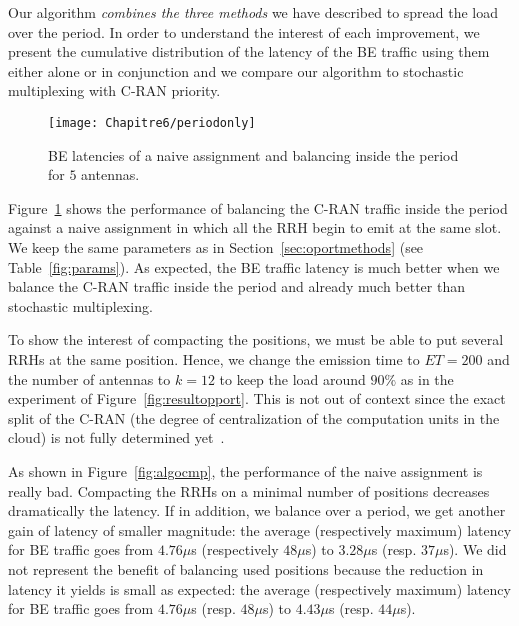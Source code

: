   Our algorithm \emph{combines the three methods} we have described to spread the load over the period.
  In order to understand the interest of each improvement, we present the cumulative distribution of the latency of the BE traffic using them either alone or in conjunction and we compare our algorithm to stochastic multiplexing with C-RAN priority.
   
\begin{figure}[h!]
\begin{center}   

      \texttt{[image: Chapitre6/periodonly]}
     \caption{BE latencies of a naive assignment and balancing inside the period for $5$ antennas.}  
     \label{fig:periodonly}
  \end{center}
  \end{figure}
    
Figure~\ref{fig:periodonly} shows the performance of balancing the C-RAN traffic inside the period against a naive assignment in which all the RRH begin to emit at the same slot. We keep the same parameters as in Section~\ref{sec:oportmethods} (see Table~\ref{fig:params}). As expected, the BE traffic latency is much better when we balance the C-RAN traffic inside the period and already much better than stochastic multiplexing.

To show the interest of compacting the positions, we must be able to put several RRHs at the same position.
Hence, we change the emission time to $ET = 200$ and the number of antennas to $k = 12$ to keep the load around $90\%$ as in the experiment of Figure~\ref{fig:resultopport}. This is not out of context since the exact split of the C-RAN (the degree of centralization of the computation units in the cloud) is not fully determined yet~\cite{mobile2011c}. 



As shown in Figure~\ref{fig:algocmp}, the performance of the naive assignment is really bad. Compacting the RRHs on a minimal number of positions decreases dramatically the latency. If in addition, we balance over a period, we get another gain of latency of smaller magnitude: the average (respectively maximum) latency for BE traffic goes from $4.76 \mu$s (respectively $48 \mu$s) to $3.28 \mu$s (resp. $37 \mu$s).
We did not represent the benefit of balancing used positions because the reduction in latency it yields is small as expected: the average (respectively maximum) latency for BE traffic goes from $4.76 \mu$s (resp. $48 \mu$s) to $4.43 \mu$s (resp. $44 \mu$s). 

